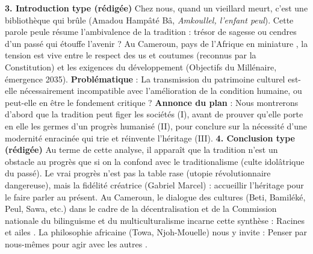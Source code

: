 \documentclass[11pt]{article}
\newcommand{\cle}[1]{{\popxbold\color{popdark}#1}}
\begin{document}
\begin{exoresolu}
    \textbf{3. Introduction type (rédigée)}
    \guillemotleft Chez nous, quand un vieillard meurt, c'est une bibliothèque qui brûle \guillemotright (Amadou Hampâté Bâ, \emph{Amkoullel, l'enfant peul}). Cette parole peule résume l'ambivalence de la tradition : trésor de sagesse ou cendres d'un passé qui étouffe l'avenir ? Au Cameroun, pays de \guillemotleft l'Afrique en miniature \guillemotright, la tension est vive entre le respect des \cle{us et coutumes} (reconnus par la Constitution) et les exigences du \cle{développement} (Objectifs du Millénaire, émergence 2035). \textbf{Problématique} : La transmission du patrimoine culturel est-elle nécessairement incompatible avec l'amélioration de la condition humaine, ou peut-elle en être le fondement critique ? \textbf{Annonce du plan} : Nous montrerons d'abord que la tradition peut figer les sociétés (I), avant de prouver qu'elle porte en elle les germes d'un progrès humanisé (II), pour conclure sur la nécessité d'une \cle{modernité enracinée} qui trie et réinvente l'héritage (III).
    \tcblower
    \textbf{4. Conclusion type (rédigée)}
    Au terme de cette analyse, il apparaît que la tradition n'est un obstacle au progrès que si on la confond avec le \cle{traditionalisme} (culte idolâtrique du passé). Le vrai progrès n'est pas la table rase (utopie révolutionnaire dangereuse), mais la \cle{fidélité créatrice} (Gabriel Marcel) : accueillir l'héritage pour le faire parler au présent. Au Cameroun, le \cle{dialogue des cultures} (Beti, Bamiléké, Peul, Sawa, etc.) dans le cadre de la \cle{décentralisation} et de la \cle{Commission nationale du bilinguisme et du multiculturalisme} incarne cette synthèse : \guillemotleft Racines et ailes \guillemotright. La philosophie africaine (Towa, Njoh-Mouelle) nous y invite : \guillemotleft Penser par nous-mêmes pour agir avec les autres \guillemotright.
\end{exoresolu}
\end{document}
